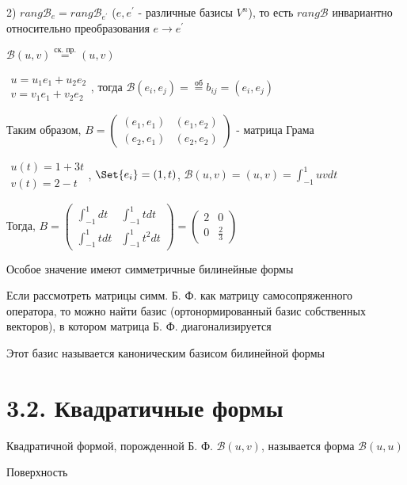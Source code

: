 \documentclass[12pt]{article}
\begin{document}
    2) $rang \mathcal{B}_e = rang \mathcal{B}_{e^\prime} $ ($e, e^\prime$ - различные базисы $V^n$), то есть $rang \mathcal{B}$ инвариантно относительно преобразования $e \to e^\prime$

    \Ex $\mathcal{B}(u, v) \stackrel{\text{ск. пр.}}{=} (u, v)$

    $\begin{matrix}u = u_1 e_1 + u_2 e_2 \\ v = v_1 e_1 + v_2 e_2\end{matrix}$, тогда $\mathcal{B}(e_i, e_j) = \stackrel{\text{об}}{=} b_{ij} = (e_i, e_j)$

    Таким образом, $B = \begin{pmatrix}(e_1, e_1) & (e_1, e_2) \\ (e_2, e_1) & (e_2, e_2)\end{pmatrix}$ - матрица Грама

    \Ex $\begin{matrix}u(t) = 1 + 3t \\ v(t) = 2 - t\end{matrix}$, $\Set{e_i} = (1, t)$, $\mathcal{B}(u, v) = (u, v) = \int_{-1}^1 uv dt$

    Тогда, $B = \begin{pmatrix}\int_{-1}^1 dt & \int_{-1}^1 t dt \\ \int_{-1}^1 t dt & \int_{-1}^1 t^2 dt\end{pmatrix} = \begin{pmatrix}2 & 0 \\ 0 & \frac{2}{3}\end{pmatrix}$



    \Nota Особое значение имеют симметричные билинейные формы

    Если рассмотреть матрицы симм. Б. Ф. как матрицу самосопряженного оператора, то можно найти базис
    (ортонормированный базис собственных векторов), в котором матрица Б. Ф. диагонализируется

    Этот базис называется каноническим базисом билинейной формы

    \section{3.2. Квадратичные формы}

    \Def Квадратичной формой, порожденной Б. Ф. $\mathcal{B}(u, v)$, называется форма $\mathcal{B}(u, u)$

    \Ex Поверхность
\end{document}
